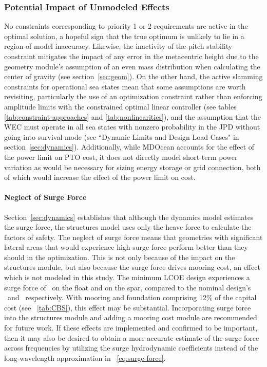 \subsubsection{Potential Impact of Unmodeled Effects}
No constraints corresponding to priority 1 or 2 requirements are active in the optimal solution, %
a hopeful sign that the true optimum is unlikely to lie in a region of model inaccuracy. Likewise, the inactivity of the pitch stability constraint mitigates the impact of any error in the metacentric height due to the geometry module's assumption of an even mass distribution when calculating the center of gravity (see section~\ref{sec:geom}). On the other hand, the active slamming constraints for operational sea states mean that some assumptions are worth revisiting, particularly the use of an optimization constraint rather than enforcing amplitude limits with the constrained optimal linear controller (see tables \ref{tab:constraint-approaches} and \ref{tab:nonlinearities}), and the assumption that the WEC must operate in all sea states with nonzero probability in the JPD without going into survival mode (see ``Dynamic Limits and Design Load Cases" in section~\ref{sec:dynamics}). Additionally, while MDOcean accounts for the effect of the power limit on PTO cost, it does not directly model short-term power variation as would be necessary for sizing energy storage or grid connection, both of which would increase the effect of the power limit on cost.

\paragraph{Neglect of Surge Force}
Section~\ref{sec:dynamics} establishes that although the dynamics model estimates the surge force, the structures model uses only the heave force to calculate the factors of safety. The neglect of surge force means that geometries with significant lateral areas that would experience high surge force perform better than they should in the optimization. This is not only because of the impact on the structures module, but also because the surge force drives mooring cost, an effect which is not modeled in this study. The minimum LCOE design experiences a surge force of \surgeForceFloatAtMinLCOE~on the float and \surgeForceSparAtMinLCOE on the spar, compared to the nominal design's \surgeForceFloatNominal~and \surgeForceSparNominal~respectively. With mooring and foundation comprising 12\% of the capital cost (see \tableautorefname~\ref{tab:CBS}), this effect may be substantial. Incorporating surge force into the structures module and adding a mooring cost module are recommended for future work. If these effects are implemented and confirmed to be important, then it may also be desired to obtain a more accurate estimate of the surge force across frequencies by utilizing the surge hydrodynamic coefficients instead of the long-wavelength approximation in \equationautorefname~\ref{eq:surge-force}. 

